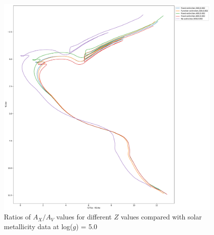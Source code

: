 \documentclass[12pt, a4paper]{report}
\begin{document}
\begin{figure}[h]
\begin{center}
\includegraphics[scale=0.3]{../basti_isochrones_10_13Gyr/Extinction_T5k_FeH0fix_func_f814w_f275wmf814w_500_400_600_Myr_FeH_0p002_ref_noext_Av_1p0.pdf}
\caption{Ratios of $A_{X}/A_{V}$ values for different $Z$ values compared with solar metallicity data at log($g$) = 5.0}
\label{wfc3_isoc2_T5k}
\end{center}
\end{figure}
\end{document}
